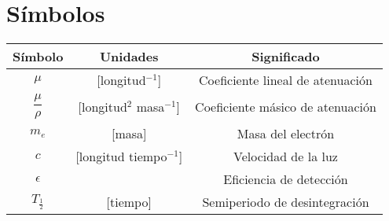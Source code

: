 \cleardoublepage
{}
{}
\chapter*{Símbolos}
\begin{table}[h]
\centering 
\begin{tabular}{|c|c|c|} \hline
\rowcolor{Blue2} Símbolo & Unidades & Significado \\ \hline
\rowcolor{Blue1} $\mu$ & [longitud$^{-1}$] & Coeficiente lineal de atenuación  \\
\rowcolor{Blue1} $\dfrac{\mu}{\rho}$ & [longitud$^2$ masa$^{-1}$]  & Coeficiente másico de atenuación \\
\rowcolor{Blue1} $m_e$ & [masa] & Masa del electrón \\
\rowcolor{Blue1} $c$ & [longitud tiempo$^{-1}$] & Velocidad de la luz \\
\rowcolor{Blue1} $\epsilon$ & & Eficiencia de detección \\ 
\rowcolor{Blue1} $T_{\frac{1}{2}}$ &  [tiempo] & Semiperiodo de desintegración \\
\hline
\end{tabular}
\end{table}